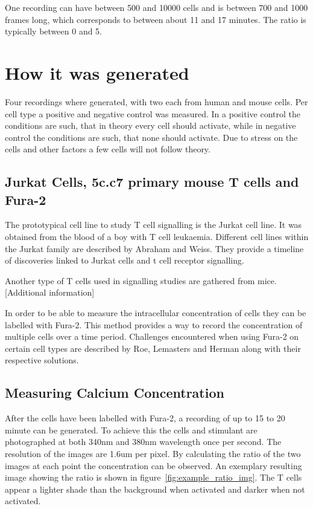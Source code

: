 One recording can have between 500 and 10000 cells and is between 700 and 1000 frames long, which corresponds to between about 11 and 17 minutes. The ratio is typically between 0 and 5.


\section{How it was generated}

Four recordings where generated, with two each from human and mouse cells. Per cell type a positive and negative control was measured. In a positive control the conditions are such, that in theory every cell should activate, while in negative control the conditions are such, that none should activate. Due to stress on the cells and other factors a few cells will not follow theory.

\subsection{Jurkat Cells, 5c.c7 primary mouse T cells and Fura-2}

The prototypical cell line to study T cell signalling is the Jurkat cell line.\cite{morgan2023} It was obtained from the blood of a boy with T cell leukaemia.\cite{schneider1977} Different cell lines within the Jurkat family are described by Abraham and Weiss.\cite{abraham2004} They provide a timeline of discoveries linked to Jurkat cells and t cell receptor signalling.

Another type of T cells used in signalling studies are gathered from mice. [Additional information]

In order to be able to measure the intracellular \Calcium concentration of cells they can be labelled with Fura-2. This method provides a way to record the \Calcium concentration of multiple cells over a time period.\cite{martinez2017} Challenges encountered when using Fura-2 on certain cell types are described by Roe, Lemasters and Herman along with their respective solutions.\cite{roe1990}

\subsection{Measuring Calcium Concentration}

After the cells have been labelled with Fura-2, a recording of up to 15 to 20 minute can be generated. To achieve this the cells and stimulant are photographed at both 340nm and 380nm wavelength once per second. The resolution of the images are 1.6um per pixel. By calculating the ratio of the two images at each point the \Calcium concentration can be observed. An exemplary resulting image showing the ratio is shown in figure~\ref{fig:example_ratio_img}. The T cells appear a lighter shade than the background when activated and darker when not activated.

